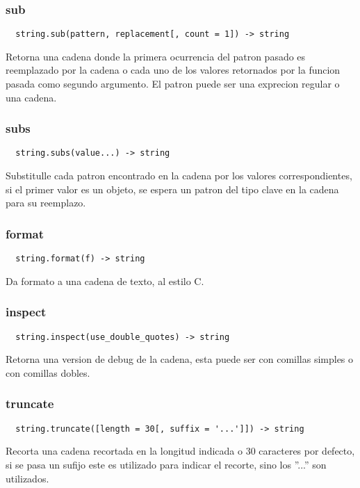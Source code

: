 \subsubsection*{sub}
\begin{verbatim}
  string.sub(pattern, replacement[, count = 1]) -> string
\end{verbatim}
Retorna una cadena donde la primera ocurrencia del patron pasado es reemplazado
por la cadena o cada uno de los valores retornados por la funcion pasada como
segundo argumento. El patron puede ser una exprecion regular o una cadena.

\subsubsection*{subs}
\begin{verbatim}
  string.subs(value...) -> string
\end{verbatim}
Substitulle cada patron encontrado en la cadena por los valores
correspondientes, si el primer valor es un objeto, se espera un patron del
tipo clave en la cadena para su reemplazo.

\subsubsection*{format}
\begin{verbatim}
  string.format(f) -> string
\end{verbatim}
Da formato a una cadena de texto, al estilo C.

\subsubsection*{inspect} 
\begin{verbatim}
  string.inspect(use_double_quotes) -> string
\end{verbatim}
Retorna una version de debug de la cadena, esta puede ser con comillas simples o
con comillas dobles.

\subsubsection*{truncate}
\begin{verbatim}
  string.truncate([length = 30[, suffix = '...']]) -> string
\end{verbatim}
Recorta una cadena recortada en la longitud indicada o 30 caracteres por
defecto, si se pasa un sufijo este es utilizado para indicar el recorte, sino
los ''...'' son utilizados.

